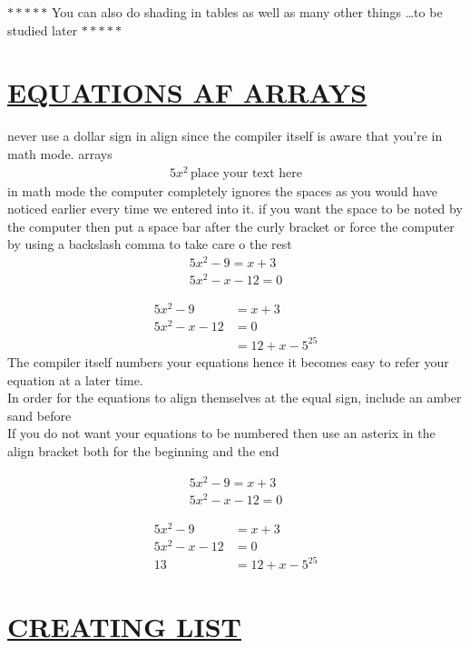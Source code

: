 \documentclass[a4paper,12pt]{article}
\begin{document}
  		 
  		$*****$ You can also do shading in tables as well as many other things \ldots to be studied later $*****$
  		 \section{\underline{EQUATIONS AF ARRAYS}}
  		 
  		never use a dollar sign in align since the compiler itself is aware that you're in math mode.
  		 	arrays
  		 	\begin{align*}
  		 		5x^2 \, \text{place your text here}
  		 		\end{align*}
  		 		in math mode the computer completely ignores the spaces as you would have noticed earlier every time we entered into it. if you want the space to be noted by the computer then put a space bar after the curly bracket or force the computer by using a backslash comma to take care o the rest\\
  		 	
  	\begin{align*}
  		5x^2-9=x+3\\
  		5x^2-x-12=0
  	\end{align*}
  		 
  		 	
  	\begin{align*}
  		 		5x^2-9 &=x+3\\
  		 		5x^2-x-12 & =0\\
  		 		&=12+x-5^25
  	\end{align*}
  	The compiler itself numbers your equations hence it becomes easy to refer your equation at a later time.\\	 	
  	In order for the equations to align themselves at the equal sign, include an amber sand
  	before\\ 
  	If you do not want your equations to be numbered then use an asterix in the align bracket both for the beginning and the end
  	
  		\begin{align*}
  		5x^2-9=x+3\\
  		5x^2-x-12=0
  	\end{align*}
  	 
  	 \begin{align*}
  	 5x^2-9 &=x+3\\
  	 5x^2-x-12 & =0\\
  	13 &=12+x-5^25
  	 \end{align*}
  	 
  	 
  	 
  	 \section{\underline{CREATING LIST}}
\end{document}
